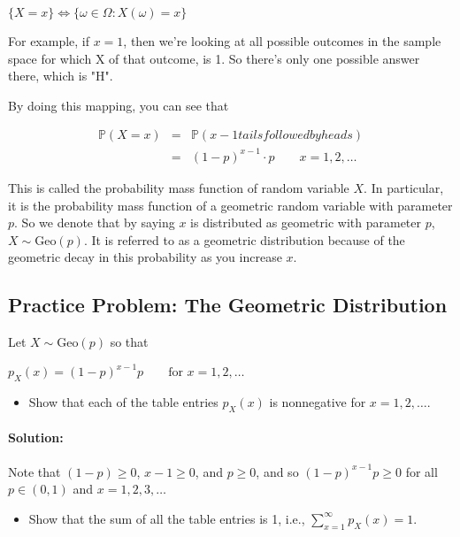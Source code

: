 \documentclass[6008notes.tex]{subfiles}
\begin{document}
{\centering$\{X = x\} \Longleftrightarrow \{ \omega \in \Omega : X(\omega) = x \}$ \par}

For example, if $x = 1$, then we're looking at all possible outcomes in the sample space for which X of that outcome, is 1. So there's only one possible answer there, which is "H". 

By doing this mapping, you can see that

\begin{eqnarray*}
\mathbb{P}(X = x) &=& \mathbb{P}(x-1 tails followed by heads) \\
									&=& (1-p)^{x-1} \cdot p \qquad x = 1, 2, \dots
\end{eqnarray*}

This is called the probability mass function of random variable $X$. In particular, it is the probability mass function of a geometric random variable with parameter $p$. So we denote that by saying $x$ is distributed as geometric with parameter $p$, $X \sim \text {Geo}(p)$. It is referred to as a geometric distribution because of the geometric decay in this probability as you increase $x$.


\subsection{Practice Problem: The Geometric Distribution}

Let $X \sim \text {Geo}(p)$ so that

{\centering$p_ X(x) = (1-p)^{x-1} p\qquad \text {for }x=1, 2, \dots$ \par}
 
\begin{itemize}
\item Show that each of the table entries $p_X(x)$ is nonnegative for $x = 1, 2, \dots$.
\end{itemize}

\paragraph{Solution: } Note that $(1-p) \ge 0$, $x-1 \ge 0$, and $p \ge 0$, and so $(1-p)^{x-1}p \ge 0$ for all $p \in (0,1)$ and $x=1,2,3,\dots$

\begin{itemize}
\item Show that the sum of all the table entries is 1, i.e., $\sum _{x=1}^\infty p_ X(x) = 1$.
\end{itemize}
\end{document}
